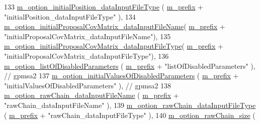 \begin{DoxyCode}
133   \hyperlink{class_q_u_e_s_o_1_1_m_l_sampling_level_options_a562837ca20c890940f09e7ea90b5aaf4}{m\_option\_initialPosition\_dataInputFileType}         (
      \hyperlink{class_q_u_e_s_o_1_1_m_l_sampling_level_options_a4423067de3fa689d820abeba4dc5babc}{m\_prefix} + \textcolor{stringliteral}{"initialPosition\_dataInputFileType"}         ),
134   \hyperlink{class_q_u_e_s_o_1_1_m_l_sampling_level_options_ada1645363cc30723d66b6c8237425ec3}{m\_option\_initialProposalCovMatrix\_dataInputFileName}(
      \hyperlink{class_q_u_e_s_o_1_1_m_l_sampling_level_options_a4423067de3fa689d820abeba4dc5babc}{m\_prefix} + \textcolor{stringliteral}{"initialProposalCovMatrix\_dataInputFileName"}),
135   \hyperlink{class_q_u_e_s_o_1_1_m_l_sampling_level_options_a75a15f2c496d82ce310669fb9de753c5}{m\_option\_initialProposalCovMatrix\_dataInputFileType}(
      \hyperlink{class_q_u_e_s_o_1_1_m_l_sampling_level_options_a4423067de3fa689d820abeba4dc5babc}{m\_prefix} + \textcolor{stringliteral}{"initialProposalCovMatrix\_dataInputFileType"}),
136   \hyperlink{class_q_u_e_s_o_1_1_m_l_sampling_level_options_a296043cd6f00282ccf1a39e219aa16ef}{m\_option\_listOfDisabledParameters}                  (
      \hyperlink{class_q_u_e_s_o_1_1_m_l_sampling_level_options_a4423067de3fa689d820abeba4dc5babc}{m\_prefix} + \textcolor{stringliteral}{"listOfDisabledParameters"}                  ), \textcolor{comment}{// gpmsa2}
137   \hyperlink{class_q_u_e_s_o_1_1_m_l_sampling_level_options_ab96236f77ecc1033bcdecbddced0c60f}{m\_option\_initialValuesOfDisabledParameters}         (
      \hyperlink{class_q_u_e_s_o_1_1_m_l_sampling_level_options_a4423067de3fa689d820abeba4dc5babc}{m\_prefix} + \textcolor{stringliteral}{"initialValuesOfDisabledParameters"}         ), \textcolor{comment}{// gpmsa2}
138   \hyperlink{class_q_u_e_s_o_1_1_m_l_sampling_level_options_a58eff69f727ad1128029a0d6fc98e556}{m\_option\_rawChain\_dataInputFileName}                (
      \hyperlink{class_q_u_e_s_o_1_1_m_l_sampling_level_options_a4423067de3fa689d820abeba4dc5babc}{m\_prefix} + \textcolor{stringliteral}{"rawChain\_dataInputFileName"}                ),
139   \hyperlink{class_q_u_e_s_o_1_1_m_l_sampling_level_options_a530bd244a5f0e9ef40f9be18ec2dae49}{m\_option\_rawChain\_dataInputFileType}                (
      \hyperlink{class_q_u_e_s_o_1_1_m_l_sampling_level_options_a4423067de3fa689d820abeba4dc5babc}{m\_prefix} + \textcolor{stringliteral}{"rawChain\_dataInputFileType"}                ),
140   \hyperlink{class_q_u_e_s_o_1_1_m_l_sampling_level_options_a21f76f865e40198fc83406f617e396c1}{m\_option\_rawChain\_size}                             (

\end{DoxyCode}
